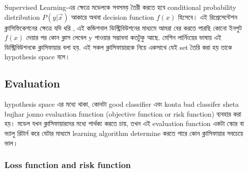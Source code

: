 \documentclass[graybox, envcountchap, twocolumn]{styles/svmult}
\begin{document}
Supervised Learning-{\bengalifont এর ক্ষেত্রে মডেলকে সবসময় তৈরী করতে হবে conditional probability distribution $P(y|\vec{x})$ আকারে অথবা decision function $f(x)$ হিসেবে।  এই রিপ্রেসেন্টেশন
ক্লাসিফিকেশনের ক্ষেত্রে যদি ধরি , এই কন্ডিশনাল ডিস্ট্রিবিউশনের মাধ্যমে আমরা বের করতে পারছি কোনো ইনপুট  $f(x)$ দেয়ার পর কোন ক্লাস লেবেল y পাওয়ার সম্ভাবনা কতটুকু আছে. মেশিন লার্নিংয়ের ভাষায় এই ডিস্ট্রিবিউশনকে ক্লাসিফায়ার বলা হয়. এই সকল ক্লাসিফায়ারকে নিয়ে একসাথে যেই set তৈরি করা হয় তাকে hypothesis space বলে। }










\subsection{Evaluation}
{\bengalifont
hypothesis space এর মধ্যে থাকা, কোনটা good classifier এবং konta bad classifer sheta bujhar jonno evaluation function (objective function or risk function) ব্যবহার করা হয়। মডেল যখন ক্লাসিফায়ারদের মধ্যে পার্থক্য করতে চায়, তখন এই evaluation function একটা স্কোর বা ভ্যালু রিটার্ন করে যেটার মাধ্যমে learning algorithm determine করতে পারে কোন ক্লাসিফায়ার সবচেয়ে ভাল।}


\subsubsection{Loss function and risk function}
\label{sec:Loss-function-and-risk-function}
\end{document}
